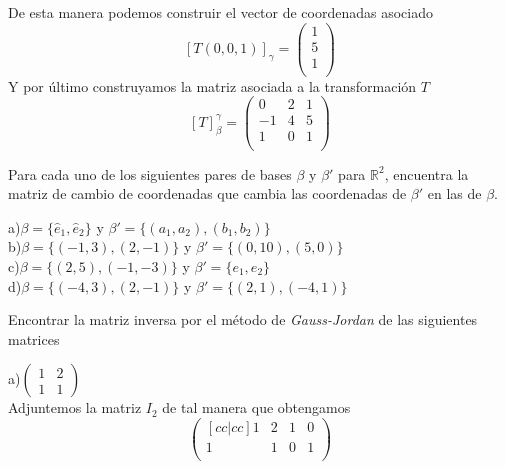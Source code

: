 \documentclass[letterpaper]{article}
\renewcommand{\*}{\cdot}
\theoremstyle{definition}
\begin{document}
		De esta manera podemos construir el vector de coordenadas asociado
		\[ [T(0,0,1)]_{\gamma} = \begin{pmatrix}
		1\\
		5\\
		1\\
		\end{pmatrix}  \]
		Y por último construyamos la matriz asociada a la transformación $ T $
		\[ [T]_{\beta}^{\gamma} = \begin{pmatrix}
		0 & 2 & 1\\
		-1 & 4 & 5\\
		1 & 0 & 1\\
		\end{pmatrix} \]	
	\begin{ejercicio}{12}
		Para cada uno de los siguientes pares de bases $\beta$ y $\beta'$ para $\mathbb{R}^{2}$, encuentra la matriz de cambio de coordenadas que cambia las coordenadas de $\beta'$ en las de $\beta$.
	\end{ejercicio}
	a)$\beta = \lbrace \hat{e}_{1},\hat{e}_{2} \rbrace$ y $\beta' = \lbrace (a_{1},a_{2}),(b_{1},b_{2}) \rbrace$\\
	b)$\beta = \lbrace (-1,3),(2,-1) \rbrace$ y $\beta' = \lbrace (0,10),(5,0) \rbrace$\\
	c)$\beta = \lbrace (2,5),(-1,-3) \rbrace$ y $\beta' = \lbrace e_{1},e_{2} \rbrace$\\
	d)$\beta = \lbrace (-4,3),(2,-1) \rbrace$ y $\beta' = \lbrace (2,1),(-4,1) \rbrace$\\
	\begin{ejercicio}{13}
		Encontrar la matriz inversa por el método de \textit{Gauss-Jordan} de las siguientes matrices 
	\end{ejercicio}
	\noindent a)$\begin{pmatrix} 1 & 2 \\ 1 & 1 \end{pmatrix}$\\
	Adjuntemos la matriz $ I_2 $ de tal manera que obtengamos
	\[\begin{pmatrix}[cc|cc]
		1 & 2 & 1 & 0 \\
		1 & 1 & 0 & 1 \\
	\end{pmatrix}\]
\end{document}
